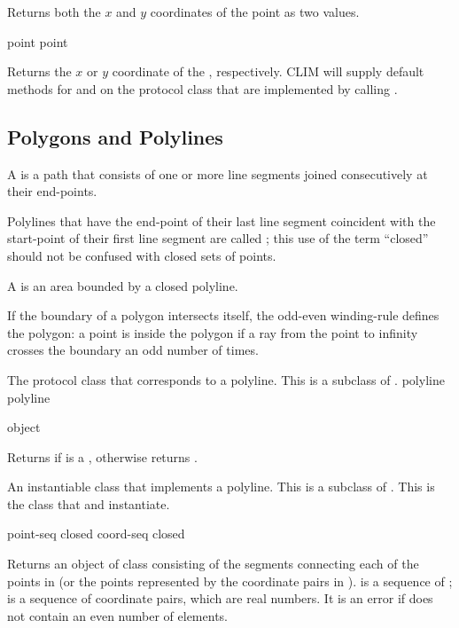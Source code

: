 Returns both the $x$ and $y$ coordinates of the point  as two values.

 {point}
 {point}

Returns the $x$ or $y$ coordinate of the  , respectively.
CLIM will supply default methods for  and  on the
protocol class  that are implemented by calling .


\subsection {Polygons and Polylines}

A  is a path that consists of one or more line segments joined
consecutively at their end-points.

Polylines that have the end-point of their last line segment coincident with the
start-point of their first line segment are called ; this use of
the term ``closed'' should not be confused with closed sets of points.

A  is an area bounded by a closed polyline. 

If the boundary of a polygon intersects itself, the odd-even winding-rule
defines the polygon: a point is inside the polygon if a ray from the point to
infinity crosses the boundary an odd number of times.


The protocol class that corresponds to a polyline.  This is a subclass of
.
 {polyline} {polyline}

 {object}

Returns  if  is a , otherwise returns
.


An instantiable class that implements a polyline.  This is a subclass of
.  This is the class that  and
 instantiate.
\Immutable

  {point-seq \key closed}
 {coord-seq \key closed}

Returns an object of class  consisting of the segments
connecting each of the points in  (or the points represented by
the coordinate pairs in ).   is a sequence of
;  is a sequence of coordinate pairs, which are real
numbers.  It is an error if  does not contain an even number of
elements.

